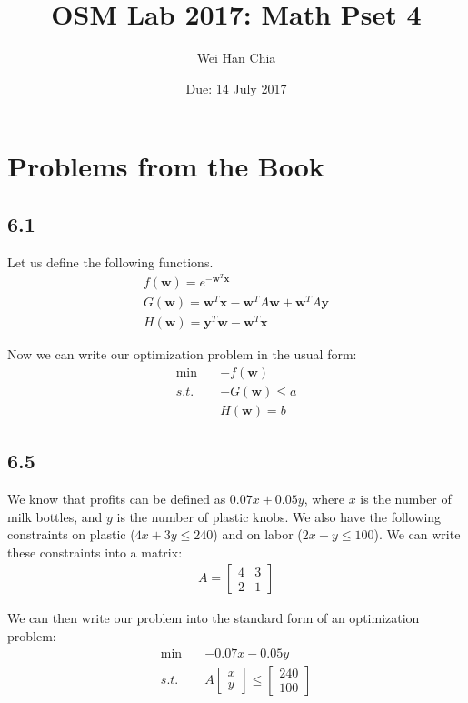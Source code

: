 \documentclass{article}
\begin{document}
	\title{OSM Lab 2017: Math Pset 4}
	\author{Wei Han Chia}
	\date{Due: 14 July 2017}
	\maketitle
	
	\section*{Problems from the Book}
	\subsection*{6.1}
	Let us define the following functions.
	\begin{align*}
	f(\mathbf{w}) = e^{-\mathbf{w}^T \mathbf{x}} \\
	G(\mathbf{w}) = \mathbf{w}^T \mathbf{x} - \mathbf{w}^T A \mathbf{w} + \mathbf{w}^T A \mathbf{y} \\
	H(\mathbf{w}) = \mathbf{y}^T \mathbf{w} - \mathbf{w}^T \mathbf{x}
	\end{align*}
	
	Now we can write our optimization problem in the usual form:
	\begin{align*}
	\min \quad&- f(\mathbf{w}) \\
	s.t. \quad&-G(\mathbf{w}) \leq a \\
	&H(\mathbf{w}) = b
	\end{align*}
	
	\subsection*{6.5}
	We know that profits can be defined as $0.07 x + 0.05 y$, where $x$ is the number of milk bottles, and $y$ is the number of plastic knobs. We also have the following constraints on plastic ($4x + 3y \leq 240$) and on labor ($2x + y \leq 100$). We can write these constraints into a matrix:
	\begin{align*}
	A = \begin{bmatrix} 4 & 3 \\ 2 & 1 \end{bmatrix}
	\end{align*}
	
	We can then write our problem into the standard form of an optimization problem:
	\begin{align*}
	\min \quad& - 0.07x - 0.05y \\
	s.t. \quad& A \begin{bmatrix} x \\ y \end{bmatrix} \leq \begin{bmatrix} 240 \\ 100 \end{bmatrix}
	\end{align*}
	
\end{document}
